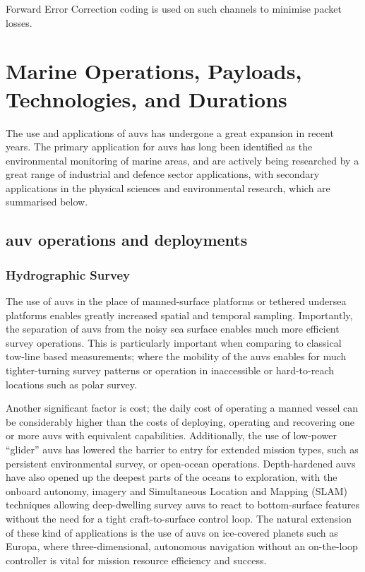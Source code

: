 Forward Error Correction coding is used on such channels to minimise packet losses.



\section{Marine Operations, Payloads, Technologies, and Durations}\label{sec:marine_ops}

The use and applications of \glspl{auv} has undergone a great expansion in recent years\cite{Alam2014}.
The primary application for \glspl{auv} has long been identified as the environmental monitoring of marine areas, and are actively being researched by a great range of industrial and defence sector applications, with secondary applications in the physical sciences and environmental research, which are summarised below\cite{Bingham2002,Wynn2014}.

\subsection{\gls{auv} operations and deployments}

\subsubsection{Hydrographic Survey}

The use of \glspl{auv} in the place of manned-surface platforms or tethered undersea platforms enables greatly increased spatial and temporal sampling.
Importantly, the separation of \glspl{auv} from the noisy sea surface enables much more efficient survey operations.
This is particularly important when comparing to classical tow-line based measurements; where the mobility of the \glspl{auv} enables for much tighter-turning survey patterns or operation in inaccessible or hard-to-reach locations such as polar survey\cite{Curtin1993}.

Another significant factor is cost; the daily cost of operating a manned vessel can be considerably higher than the costs of deploying, operating and recovering one or more \glspl{auv} with equivalent capabilities\cite{Nicholson2008}.
Additionally, the use of low-power ``glider'' \glspl{auv} has lowered the barrier to entry for extended mission types, such as persistent environmental survey, or open-ocean operations. 
Depth-hardened \glspl{auv} have also opened up the deepest parts of the oceans to exploration, with the onboard autonomy, imagery and Simultaneous Location and Mapping (SLAM) techniques allowing deep-dwelling survey \glspl{auv} to react to bottom-surface features without the need for a tight craft-to-surface control loop.
The natural extension of these kind of applications is the use of \glspl{auv} on ice-covered planets such as Europa, where three-dimensional, autonomous navigation without an on-the-loop controller is vital for mission resource efficiency and success.

